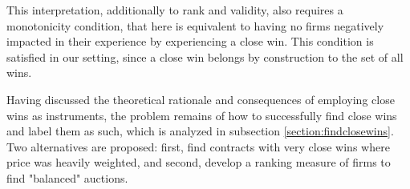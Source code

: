 This interpretation, additionally to rank and validity, also requires a monotonicity condition, that here is equivalent to having no firms negatively impacted in their experience by experiencing a close win. This condition is satisfied in our setting, since a close win belongs by construction to the set of all wins.

Having discussed the theoretical rationale and consequences of employing close wins as instruments, the problem remains of how to successfully find close wins and label them as such, which is analyzed in subsection \ref{section:findclosewins}. Two alternatives are proposed: first, find contracts with very close wins where price was heavily weighted, and second, develop a ranking measure of firms to find "balanced" auctions.

